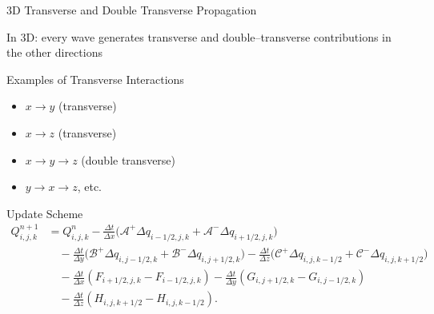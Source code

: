 
\begin{frame}{3D Transverse and Double Transverse Propagation}
	\scriptsize
	
    In 3D: every wave generates transverse and double–transverse contributions in the other directions

\vspace{0.5em} 
Examples of Transverse Interactions
		\begin{itemize}
			\item $x \to y$ (transverse) 
			\item $x \to z$ (transverse)
			\item $x \to y \to z$ (double transverse)
			\item $y \to x \to z$, etc.
		\end{itemize}

	\begin{block}{Update Scheme}
	\[
	\begin{aligned}
		Q_{i,j,k}^{n+1} &= Q_{i,j,k}^n
		- \frac{\Delta t}{\Delta x} \Big( \mathcal{A}^+ \Delta q_{i-1/2,j,k}
		+ \mathcal{A}^- \Delta q_{i+1/2,j,k} \Big) \\
		& \quad- \frac{\Delta t}{\Delta y} \Big( \mathcal{B}^+ \Delta q_{i,j-1/2,k}
		+ \mathcal{B}^- \Delta q_{i,j+1/2,k} \Big) 
		- \frac{\Delta t}{\Delta z} \Big( \mathcal{C}^+ \Delta q_{i,j,k-1/2}
		+ \mathcal{C}^- \Delta q_{i,j,k+1/2} \Big) \\
		&\quad - \frac{\Delta t}{\Delta x} \left( F_{i+1/2,j,k} - F_{i-1/2,j,k} \right) 
		- \frac{\Delta t}{\Delta y} \left( G_{i,j+1/2,k} - G_{i,j-1/2,k} \right) \\
		&\quad- \frac{\Delta t}{\Delta z} \left( H_{i,j,k+1/2} - H_{i,j,k-1/2} \right).
	\end{aligned}
	\]
\end{block}
\end{frame}


